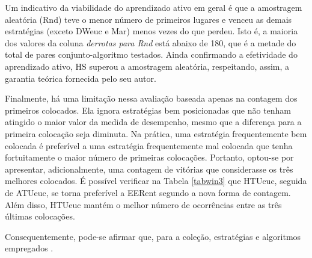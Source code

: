 Um indicativo da viabilidade do aprendizado ativo em geral é que a amostragem aleatória (Rnd) teve o menor número de primeiros lugares e venceu as demais estratégias (exceto DWeuc e Mar) menos vezes do que perdeu.
Isto é, a maioria dos valores da coluna \textit{derrotas para Rnd} está abaixo de 180, que é a metade do total de pares conjunto-algoritmo testados.
Ainda confirmando a efetividade do aprendizado ativo, HS superou a amostragem aleatória, respeitando, assim, a garantia teórica fornecida pelo seu autor.

Finalmente, há uma limitação nessa avaliação baseada apenas na contagem dos primeiros colocados.
Ela ignora estratégias bem posicionadas que não tenham atingido o maior valor da medida de desempenho, mesmo que a diferença para a primeira colocação seja diminuta.
Na prática, uma estratégia frequentemente bem colocada é preferível a uma estratégia frequentemente mal colocada que tenha fortuitamente o maior número de primeiras colocações.
Portanto, optou-se por apresentar, adicionalmente, uma contagem de vitórias que considerasse os três melhores colocados.
É possível verificar na Tabela \ref{tabwin3} que HTUeuc, seguida de ATUeuc, se torna preferível a EERent segundo a nova forma de contagem.
Além disso, HTUeuc mantém o melhor número de ocorrências entre as três últimas colocações.
\begin{table}
\caption[Contagem das três melhores e três piores colocações (ALC-$\mu_{\kappa}$).]{Contagem das três melhores e três piores colocações. Medida: ALC-$\mu_{\kappa}$. \textit{Detalhes na Tabela \ref{exfried}.}}
\label{tabwin3}
\centering
{}
\end{table}
Consequentemente, pode-se afirmar que, para a coleção, estratégias e algoritmos empregados .


